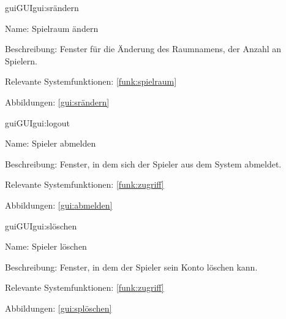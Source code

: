 \begin{description}[leftmargin=5em, style=sameline]	
	\begin{lhp}{gui}{GUI}{gui:srändern}
		\item[Name:] Spielraum ändern
		\item[Beschreibung:] Fenster für die Änderung des Raumnamens, der Anzahl an Spielern.
		\item[Relevante Systemfunktionen:] \ref{funk:spielraum}
		\item[Abbildungen:] \ref{gui:srändern}
	\end{lhp}
\end{description}



\begin{description}[leftmargin=5em, style=sameline]	
	\begin{lhp}{gui}{GUI}{gui:logout}
		\item[Name:] Spieler abmelden
		\item[Beschreibung:]  Fenster, in dem sich der Spieler aus dem System abmeldet.
		\item[Relevante Systemfunktionen:] \ref{funk:zugriff}
		\item[Abbildungen:] \ref{gui:abmelden}
	\end{lhp}
\end{description}



\begin{description}[leftmargin=5em, style=sameline]	
	\begin{lhp}{gui}{GUI}{gui:slöschen}
		\item[Name:] Spieler löschen
		\item[Beschreibung:]  Fenster, in dem der Spieler sein Konto löschen kann.
		\item[Relevante Systemfunktionen:] \ref{funk:zugriff}
		\item[Abbildungen:] \ref{gui:splöschen}
	\end{lhp}
\end{description}


